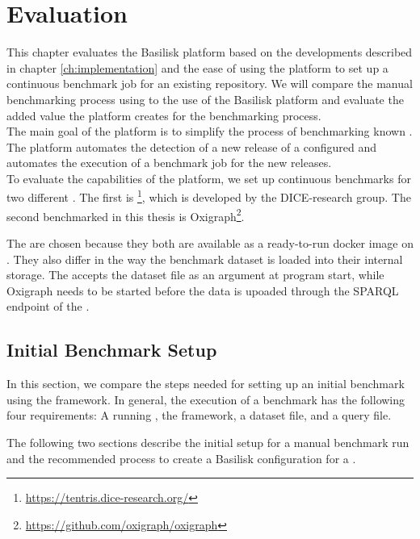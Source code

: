 \chapter{Evaluation}
\label{ch:evaluation}

This chapter evaluates the Basilisk platform based on the developments described in chapter \ref{ch:implementation} and the ease of using the platform to set up a continuous benchmark job for an existing repository.
We will compare the manual benchmarking process using \iguana{} to the use of the Basilisk platform and evaluate the added value the platform creates for the benchmarking process.
\\

The main goal of the platform is to simplify the process of benchmarking known \tsp{}. 
The platform automates the detection of a new release of a configured \ts{} and automates the execution of a benchmark job for the new releases.
\\

To evaluate the capabilities of the platform, we set up continuous benchmarks for two different \tsp{}.
The first \ts{} is \tentris{}\footnote{\url{https://tentris.dice-research.org/}}, which is developed by the DICE-research group.
The second \ts{} benchmarked in this thesis is Oxigraph\footnote{\url{https://github.com/oxigraph/oxigraph}}.

The \tsp{} are chosen because they both are available as a ready-to-run docker image on \dockh{}.
They also differ in the way the benchmark dataset is loaded into their internal storage.
The \tentris{} \ts{} accepts the dataset file as an argument at program start, while Oxigraph needs to be started before the data is upoaded through the SPARQL endpoint of the \ts{}.


\section{Initial Benchmark Setup}
In this section, we compare the steps needed for setting up an initial \ts{} benchmark using the \iguana{} framework.
In general, the execution of a benchmark has the following four requirements:
A running \ts{}, the \iguana{} framework, a dataset file, and a query file.

The following two sections describe the initial setup for a manual benchmark run and the recommended process to create a Basilisk configuration for a \ts{}.


